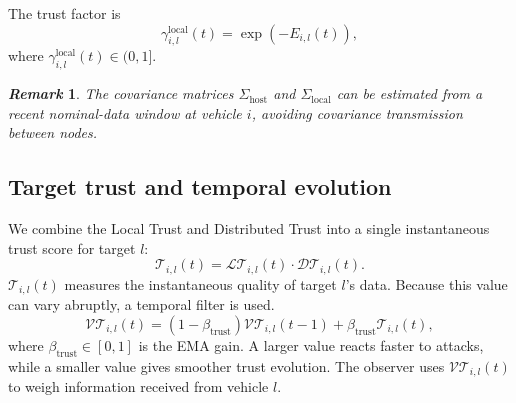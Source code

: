 \documentclass{ifacconf}
\def\LT{\mathcal{LT}} %
\def\DT{\mathcal{DT}} %
\def\VT{\mathcal{VT}} %
\def\T{\mathcal{T}} %
\newtheorem{remark}{\it \textbf{Remark}}%
\begin{document}
The trust factor is
\begin{equation}
    \gamma_{i,l}^{\text{local}}(t) = \exp\left( -{E_{i,l}(t)} \right),
\end{equation}
where $\gamma_{i,l}^{\text{local}}(t) \in (0, 1]$. 
\begin{remark}
The covariance matrices $\Sigma_{\text{host}}$ and $\Sigma_{\text{local}}$ can be estimated from a recent nominal-data window at vehicle \(i\), avoiding covariance transmission between nodes.
\end{remark}
\vspace*{-0.3cm}
\subsection{Target trust and temporal evolution}\label{subsec_evolution}
\vspace*{-0.2cm}
We combine the Local Trust and Distributed Trust into a single instantaneous trust score for target $l$:
\begin{equation}
    \T_{i,l}(t) =  \LT_{i,l}(t) \cdot \DT_{i,l}(t). 
    \label{trs_sample_genral}
\end{equation}
$\T_{i,l}(t)$ measures the instantaneous quality of target $l$'s data.
Because this value can vary abruptly, a temporal filter is used.
\begin{equation}
    \VT_{i,l}(t) =
    (1-\beta_{\text{trust}})\VT_{i,l}(t-1)
    +\beta_{\text{trust}}\T_{i,l}(t),
\end{equation}
where $\beta_{\text{trust}}\in[0,1]$ is the EMA gain. A larger value reacts faster to attacks, while a smaller value gives smoother trust evolution. The observer uses $\VT_{i,l}(t)$ to weigh information received from vehicle $l$.
\end{document}
